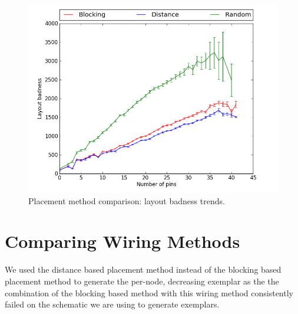 \begin{figure}
\begin{center}
\includegraphics[width=\textwidth]{Images/placement_badness_trend_comparison.png}
\caption{Placement method comparison: layout badness trends.}
\label{fig:placement_badness_trend}
\end{center}
\end{figure}

\section{Comparing Wiring Methods}

We used the distance based placement method instead of the
blocking based
placement method to generate the per-node, decreasing exemplar as the the
combination of the blocking based method with this wiring method consistently
failed on the schematic we are using to generate exemplars.

